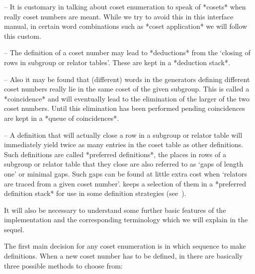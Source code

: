 \item{--} It is customary in  talking about coset enumeration to speak
of *cosets* when really coset numbers are  meant.  While
we try to avoid  this  in  this  interface  manual,  in  certain  word
combinations such as *coset application*  we
will follow this custom.

\item{--} The   definition   of   a   coset   number   may   lead   to
*deductions*  from  the  \lq{}closing  of   rows   in
subgroup  or  relator  tables'.  These  are  kept  in   a   *deduction
stack*.

\item{--} Also   it  may  be  found  that  (different)  words  in  the
generators defining different coset numbers really  lie  in  the  same
coset    of    the    given    subgroup.    This    is    called     a
*coincidence*  and  will  eventually  lead  to  the
elimination of the  larger  of  the  two  coset  numbers.  Until  this
elimination has been performed pending  coincidences  are  kept  in  a
*queue of coincidences*.

\item{--} A definition that will actually close a row in a subgroup or
relator table will immediately yield twice  as  many  entries  in  the
coset  table  as  other  definitions.  Such  definitions  are   called
*preferred definitions*,  the  places  in
rows of a subgroup or relator table that they close are also  referred
to as \lq{}gaps of length one' or minimal gaps. Such gaps can be found
at little extra cost when \lq{}relators are traced from a given  coset
number'. {\ACE} keeps a selection of them in a  *preferred  definition
stack* for use  in  some  definition
strategies (see~\cite{Hav91}).

\endlist

It will also be necessary to understand some further basic features of
the  implementation and  the corresponding  terminology which  we will
explain in the sequel.


The first main decision for any coset enumeration is in which sequence
to make definitions. When a new coset number has  to  be  defined,  in
{\ACE} there are basically three possible methods to choose from:

